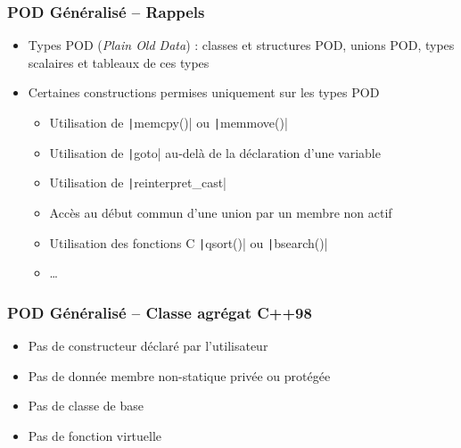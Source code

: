 \documentclass[C++.tex]{subfiles}
\begin{document}
\begin{frame}[fragile]
	\frametitle{POD Généralisé -- Rappels}
	\begin{itemize}
		\item Types POD (\textit{Plain Old Data}) : classes et structures POD, unions POD, types scalaires et tableaux de ces types
		\item Certaines constructions permises uniquement sur les types POD


		\begin{itemize}
			\item Utilisation de \texttt|memcpy()| ou \texttt|memmove()|
			\item Utilisation de \texttt|goto| au-delà de la déclaration d'une variable


			\item Utilisation de \texttt|reinterpret_cast|
			\item Accès au début commun d'une union par un membre non actif
			\item Utilisation des fonctions C \texttt|qsort()| ou \texttt|bsearch()|
			\item \ldots{}
		\end{itemize}
	\end{itemize}
\end{frame}

\begin{frame}[fragile]
	\frametitle{POD Généralisé -- Classe agrégat C++98}
	\begin{itemize}
		\item Pas de constructeur déclaré par l'utilisateur
		\item Pas de donnée membre non-statique privée ou protégée
		\item Pas de classe de base
		\item Pas de fonction virtuelle
	\end{itemize}
\end{frame}
\end{document}
